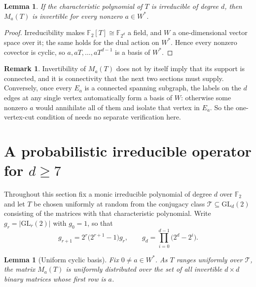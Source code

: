 \documentclass[11pt,reqno]{amsart}
\theoremstyle{plain}
\newtheorem{lemma}[theorem]{Lemma}
\theoremstyle{definition}
\newtheorem{remark}[theorem]{Remark}
\newcommand{\FF}{\mathbb{F}}
\newcommand{\GL}{\mathrm{GL}}
\begin{document}
\begin{lemma}\label{lem:irred}
If the characteristic polynomial of $T$ is irreducible of degree $d$, then $M_{a}(T)$ is invertible for every nonzero $a\in W^{*}$.
\end{lemma}

\begin{proof}
Irreducibility makes $\FF_{2}[T]\cong\FF_{2^{d}}$ a field, and $W$ a one-dimensional vector space over it; the same holds for the dual action on $W^{*}$. Hence every nonzero covector is cyclic, so $a,aT,\dots,aT^{d-1}$ is a basis of $W^{*}$.
\end{proof}

\begin{remark}\label{rem:stars}
Invertibility of $M_{a}(T)$ does not by itself imply that its support is connected, and it is connectivity that the next two sections must supply. Conversely, once every $E_{a}$ is a connected spanning subgraph, the labels on the $d$ edges at any single vertex automatically form a basis of $W$: otherwise some nonzero $a$ would annihilate all of them and isolate that vertex in $E_{a}$. So the one-vertex-cut condition of \cite[Lemma 2.1]{AlonConn} needs no separate verification here.
\end{remark}

\section{A probabilistic irreducible operator for \texorpdfstring{$d\ge 7$}{d>=7}}\label{sec:prob}

Throughout this section fix a monic irreducible polynomial of degree $d$ over $\FF_{2}$ and let $T$ be chosen uniformly at random from the conjugacy class $\mathcal{T}\subseteq\GL_{d}(2)$ consisting of the matrices with that characteristic polynomial. Write $g_{r}=|\GL_{r}(2)|$ with $g_{0}=1$, so that
\begin{equation}\label{eq:grec}
g_{r+1}=2^{r}\bigl(2^{r+1}-1\bigr)g_{r},\qquad g_{d}=\prod_{i=0}^{d-1}\bigl(2^{d}-2^{i}\bigr).
\end{equation}

\begin{lemma}[Uniform cyclic basis]\label{lem:uniform}
Fix $0\ne a\in W^{*}$. As $T$ ranges uniformly over $\mathcal{T}$, the matrix $M_{a}(T)$ is uniformly distributed over the set of all invertible $d\times d$ binary matrices whose first row is $a$.
\end{lemma}
\end{document}
